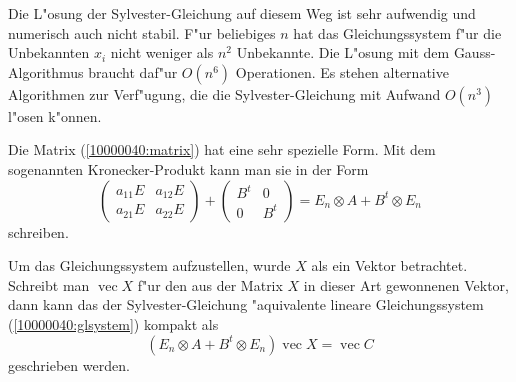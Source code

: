 \begin{diskussion}
Die L"osung der Sylvester-Gleichung auf diesem Weg ist sehr aufwendig und
numerisch auch nicht stabil. 
F"ur beliebiges $n$ hat das Gleichungssystem f"ur die Unbekannten $x_i$ 
nicht weniger als $n^2$ Unbekannte.
Die L"osung mit dem Gauss-Algorithmus braucht daf"ur $O(n^6)$ Operationen.
Es stehen alternative Algorithmen zur Verf"ugung, die die Sylvester-Gleichung
mit Aufwand $O(n^3)$ l"osen k"onnen.

Die Matrix (\ref{10000040:matrix}) hat eine sehr spezielle Form.
Mit dem sogenannten Kronecker-Produkt kann man sie in der Form
\[
\begin{pmatrix}
a_{11}E&a_{12}E\\
a_{21}E&a_{22}E
\end{pmatrix}
+
\begin{pmatrix}
B^t&0\\
0&B^t
\end{pmatrix}
=
E_n \otimes A
+
B^t \otimes E_n
\]
schreiben.

Um das Gleichungssystem aufzustellen, wurde $X$ als ein Vektor betrachtet.
Schreibt man $\operatorname{vec}X$ f"ur den aus der Matrix $X$ in dieser Art
gewonnenen Vektor, dann kann das der Sylvester-Gleichung "aquivalente
lineare Gleichungssystem (\ref{10000040:glsystem}) kompakt als
\[
(E_n \otimes A
+
B^t \otimes E_n)\operatorname{vec}X
=
\operatorname{vec}C
\]
geschrieben werden.
\end{diskussion}


